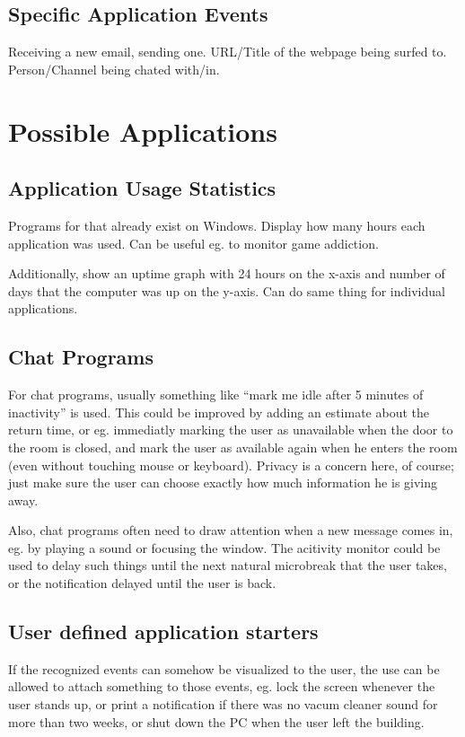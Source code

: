 \documentclass[]{article}
\begin{document}
\subsection{Specific Application Events}
Receiving a new email, sending one. URL/Title of the webpage being
surfed to. Person/Channel being chated with/in.

\section{Possible Applications}

\subsection{Application Usage Statistics}
Programs for that already exist on Windows. Display how many hours
each application was used. Can be useful eg. to monitor game
addiction.

Additionally, show an uptime graph with 24 hours on the x-axis and
number of days that the computer was up on the y-axis. Can do same
thing for individual applications.

\subsection{Chat Programs}
For chat programs, usually something like ``mark me idle after 5
minutes of inactivity'' is used. This could be improved by adding an
estimate about the return time, or eg. immediatly marking the user as
unavailable when the door to the room is closed, and mark the user as
available again when he enters the room (even without touching mouse
or keyboard). Privacy is a concern here, of course; just make sure the
user can choose exactly how much information he is giving away.

Also, chat programs often need to draw attention when a new message
comes in, eg. by playing a sound or focusing the window. The acitivity
monitor could be used to delay such things until the next natural
microbreak that the user takes, or the notification delayed until the
user is back.

\subsection{User defined application starters}
If the recognized events can somehow be visualized to the user, the
use can be allowed to attach something to those events, eg. lock the
screen whenever the user stands up, or print a notification if there
was no vacum cleaner sound for more than two weeks, or shut down the
PC when the user left the building.
\end{document}
